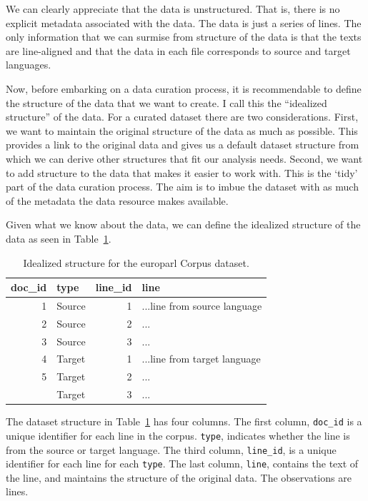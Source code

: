 \documentclass[
  letterpaper,
  DIV=11,
  numbers=noendperiod]{scrreport}
\theoremstyle{definition}
\theoremstyle{remark}
\begin{document}
We can clearly appreciate that the data is unstructured. That is, there
is no explicit metadata associated with the data. The data is just a
series of lines. The only information that we can surmise from structure
of the data is that the texts are line-aligned and that the data in each
file corresponds to source and target languages.

Now, before embarking on a data curation process, it is recommendable to
define the structure of the data that we want to create. I call this the
``idealized structure'' of the data. For a curated dataset there are two
considerations. First, we want to maintain the original structure of the
data as much as possible. This provides a link to the original data and
gives us a default dataset structure from which we can derive other
structures that fit our analysis needs. Second, we want to add structure
to the data that makes it easier to work with. This is the `tidy' part
of the data curation process. The aim is to imbue the dataset with as
much of the metadata the data resource makes available.

Given what we know about the data, we can define the idealized structure
of the data as seen in Table~\ref{tbl-cd-europarl-structure-example}.

\hypertarget{tbl-cd-europarl-structure-example}{}
\begin{table}[!h]
\caption{\label{tbl-cd-europarl-structure-example}Idealized structure for the europarl Corpus dataset. }\tabularnewline

\centering
\begin{tabular}{rlrl}
\toprule
doc\_id & type & line\_id & line\\
\midrule
1 & Source & 1 & ...line from source language\\
2 & Source & 2 & ...\\
3 & Source & 3 & ...\\
4 & Target & 1 & ...line from target language\\
5 & Target & 2 & ...\\
\addlinespace
6 & Target & 3 & ...\\
\bottomrule
\end{tabular}
\end{table}

The dataset structure in Table~\ref{tbl-cd-europarl-structure-example}
has four columns. The first column, \texttt{doc\_id} is a unique
identifier for each line in the corpus. \texttt{type}, indicates whether
the line is from the source or target language. The third column,
\texttt{line\_id}, is a unique identifier for each line for each
\texttt{type}. The last column, \texttt{line}, contains the text of the
line, and maintains the structure of the original data. The observations
are lines.
\end{document}

